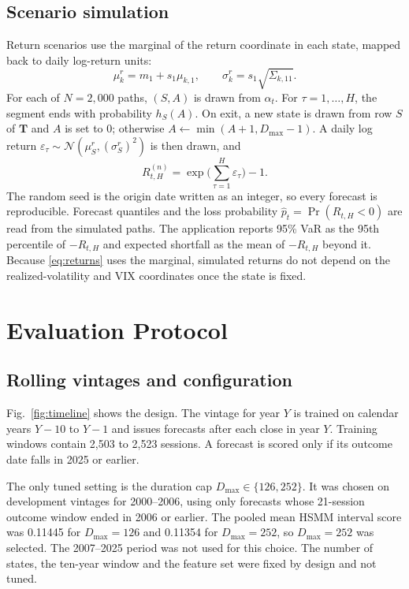 \documentclass[conference]{IEEEtran}
\newcommand{\Dmax}{D_{\max}}
\newcommand{\Normal}{\mathcal{N}}
\begin{document}
\subsection{Scenario simulation}
Return scenarios use the marginal of the return coordinate in each state, mapped back to daily log-return units:
\begin{equation}
\mu^{r}_k=m_1+s_1\mu_{k,1},\qquad \sigma^{r}_k=s_1\sqrt{\Sigma_{k,11}}.
\label{eq:returns}
\end{equation}
For each of $N=2{,}000$ paths, $(S,A)$ is drawn from $\alpha_t$. For $\tau=1,\dots,H$, the segment ends with probability $h_S(A)$. On exit, a new state is drawn from row $S$ of $\mathbf{T}$ and $A$ is set to 0; otherwise $A\leftarrow\min(A+1,\Dmax-1)$. A daily log return $\varepsilon_\tau\sim\Normal(\mu^{r}_S,(\sigma^{r}_S)^2)$ is then drawn, and
\begin{equation}
R^{(n)}_{t,H}=\exp\Big(\sum_{\tau=1}^{H}\varepsilon_\tau\Big)-1 .
\label{eq:sim}
\end{equation}
The random seed is the origin date written as an integer, so every forecast is reproducible. Forecast quantiles and the loss probability $\hat p_t=\Pr(R_{t,H}<0)$ are read from the simulated paths. The application reports 95\% VaR as the 95th percentile of $-R_{t,H}$ and expected shortfall as the mean of $-R_{t,H}$ beyond it. Because \eqref{eq:returns} uses the marginal, simulated returns do not depend on the realized-volatility and VIX coordinates once the state is fixed.

\section{Evaluation Protocol}
\label{sec:protocol}
\subsection{Rolling vintages and configuration}
Fig.~\ref{fig:timeline} shows the design. The vintage for year $Y$ is trained on calendar years $Y-10$ to $Y-1$ and issues forecasts after each close in year $Y$. Training windows contain 2,503 to 2,523 sessions. A forecast is scored only if its outcome date falls in 2025 or earlier.

The only tuned setting is the duration cap $\Dmax\in\{126,252\}$. It was chosen on development vintages for 2000--2006, using only forecasts whose 21-session outcome window ended in 2006 or earlier. The pooled mean HSMM interval score was 0.11445 for $\Dmax=126$ and 0.11354 for $\Dmax=252$, so $\Dmax=252$ was selected. The 2007--2025 period was not used for this choice. The number of states, the ten-year window and the feature set were fixed by design and not tuned.
\end{document}
